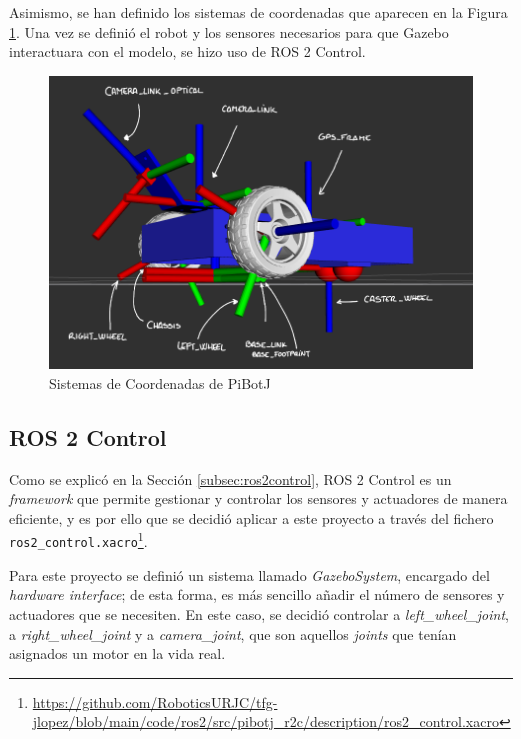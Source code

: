 Asimismo, se han definido los sistemas de coordenadas que aparecen en la Figura \ref{fig:links}. Una vez se definió el robot y los sensores necesarios para que Gazebo interactuara con el modelo, se hizo uso de ROS 2 Control. 

\begin{figure} [h!]
	\begin{center}
		\includegraphics[width=13cm]{figs/cap6/links.png}
	\end{center}
	\caption{Sistemas de Coordenadas de PiBotJ}
	\label{fig:links}
\end{figure}


\subsection{ROS 2 Control}
\label{subsec:cap6ros2control}

Como se explicó en la Sección \ref{subsec:ros2control}, ROS 2 Control es un \textit{framework} que permite gestionar y controlar los sensores y actuadores de manera eficiente, y es por ello que se decidió aplicar a este proyecto a través del fichero \verb|ros2_control.xacro|\footnote{\url{https://github.com/RoboticsURJC/tfg-jlopez/blob/main/code/ros2/src/pibotj_r2c/description/ros2_control.xacro}}.

Para este proyecto se definió un sistema llamado \textit{GazeboSystem}, encargado del \textit{hardware interface}; de esta forma, es más sencillo añadir el número de sensores y actuadores que se necesiten. En este caso, se decidió controlar a \textit{left\_wheel\_joint}, a \textit{right\_wheel\_joint} y a \textit{camera\_joint}, que son aquellos \textit{joints} que tenían asignados un motor en la vida real. 


